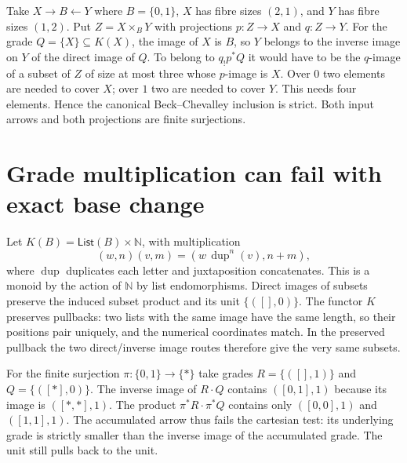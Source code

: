 \documentclass[11pt]{article}
\begin{document}
Take $X\to B\leftarrow Y$ where $B=\{0,1\}$, $X$ has fibre sizes $(2,1)$,
and $Y$ has fibre sizes $(1,2)$. Put $Z=X\times_B Y$ with projections
$p:Z\to X$ and $q:Z\to Y$. For the grade $Q=\{X\}\subseteq K(X)$,
the image of $X$ is $B$, so $Y$ belongs to the inverse image on $Y$ of
the direct image of $Q$. To belong to $q_!p^*Q$ it would have to be the
$q$-image of a subset of $Z$ of size at most three whose $p$-image is $X$.
Over $0$ two elements are needed to cover $X$; over $1$ two are
needed to cover $Y$. This needs four elements. Hence the canonical
Beck--Chevalley inclusion is strict. Both input arrows and both
projections are finite surjections.

\section{Grade multiplication can fail with exact base change}\label{sec:mult}
Let $K(B)=\mathsf{List}(B)\times\mathbb N$, with multiplication
\[
 (w,n)(v,m)=(w\,\operatorname{dup}^{n}(v),n+m),
\]
where $\operatorname{dup}$ duplicates each letter and juxtaposition
concatenates. This is a monoid by the action of $\mathbb N$ by list
endomorphisms. Direct images of subsets preserve the induced subset
product and its unit $\{([],0)\}$. The functor $K$ preserves pullbacks:
two lists with the same image have the same length, so their positions
pair uniquely, and the numerical coordinates match. In the preserved
pullback the two direct/inverse image routes therefore give the very
same subsets.

For the finite surjection $\pi:\{0,1\}\to\{*\}$ take grades
$R=\{([],1)\}$ and $Q=\{([*],0)\}$. The inverse image of $R\cdot Q$
contains $([0,1],1)$ because its image is $([*,*],1)$.
The product $\pi^*R\cdot\pi^*Q$ contains only $([0,0],1)$ and
$([1,1],1)$. The accumulated arrow thus fails the cartesian test: its
underlying grade is strictly smaller than the inverse image of the
accumulated grade. The unit still pulls back to the unit.
\end{document}
